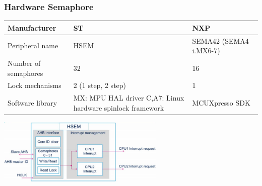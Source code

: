 \subsubsection{Hardware Semaphore}
\begin{table}[h]
    \begin{tabularx}{\textwidth}{lXX}
        \hline
        Manufacturer         & ST                                                                  & NXP                    \\\hline
        Peripheral name      & HSEM                                                                & SEMA42 (SEMA4 i.MX6-7) \\
        Number of semaphores & 32                                                                  & 16                     \\
        Lock mechanisms      & 2 (1 step, 2 step)                                                  & 1                      \\
        Software library     & MX: MPU HAL driver C,\newline A7: Linux hardware spinlock framework & MCUXpresso SDK         \\\hline
    \end{tabularx}
\end{table}
\includegraphics[width=0.6\textwidth]{images/Multicore/hw_semaphores}

